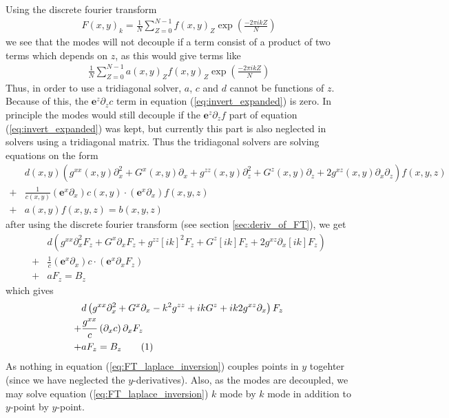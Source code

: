 \documentclass[12pt]{article}
\def\L{\left}
\def\R{\right}
\newcommand{\ve}[1]{\ensuremath{\boldsymbol{#1}}}
\newcommand\numberthis{\addtocounter{equation}{1}\tag{\theequation}}
\begin{document}
Using the discrete fourier transform
%
\begin{align}
    F(x,y)_{k} =
    \frac{1}{N}\sum_{Z=0}^{N-1}f(x,y)_{Z}\exp\L(\frac{-2\pi i k Z}{N}\R)
\end{align}
%
we see that the modes will not decouple if a term consist of a product of two
terms which depends on $z$, as this would give terms like
%
\begin{align*}
    \frac{1}{N}\sum_{Z=0}^{N-1}
        a(x,y)_Z
        f(x,y)_Z
        \exp\L(\frac{-2\pi i k Z}{N}\R)
\end{align*}
%
Thus, in order to use a tridiagonal solver, $a$, $c$ and $d$ cannot be
functions of $z$. Because of this, the $\ve{e}^z \partial_z c$ term in equation
(\ref{eq:invert_expanded}) is zero. In principle the modes would still decouple
if the $\ve{e}^z \partial_z f$ part of equation (\ref{eq:invert_expanded}) was
kept, but currently this part is also neglected in solvers using a tridiagonal
matrix. Thus the tridiagonal solvers are solving equations on the form
%
\begin{align*}
    \, &d(x,y)
    \L(    g^{xx}(x,y) \partial_x^2
         + G^x(x,y) \partial_x
         + g^{zz}(x,y) \partial_z^2
         + G^z(x,y) \partial_z
         + 2g^{xz}(x,y) \partial_x \partial_z
    \R)
    f(x,y,z)
    \\
%
    +& \frac{1}{c(x,y)}\L(
          \ve{e}^x \partial_x
    \R)
    c(x,y)
    \cdot
       \L(
          \ve{e}^x \partial_x
       \R)
       f(x,y,z)
       \\
%
   +& a(x,y)f(x,y,z) = b(x,y,z)
\end{align*}
%
after using the discrete fourier transform (see section \ref{sec:deriv_of_FT}),
we get
%
\begin{align*}
    \, &d
    \L(    g^{xx} \partial_x^2F_z
         + G^x \partial_xF_z
         + g^{zz} [i k]^2F_z
         + G^z [i k]F_z
         + 2g^{xz} \partial_x[i k]F_z
    \R)
    \\
%
    +& \frac{1}{c}\L(
          \ve{e}^x \partial_x
    \R)
    c
    \cdot
       \L(
          \ve{e}^x \partial_xF_z
       \R)
       \\
%
    +& aF_z = B_z
\end{align*}
%
which gives
%
\begin{align*}
    \, &d
    \L(    g^{xx} \partial_x^2
         + G^x \partial_x
         - k^2 g^{zz}
         + i kG^z
         + i k2g^{xz} \partial_x
    \R)F_z
    \\
%
    +& \frac{g^{xx}}{c}
    \L(
        \partial_x c
    \R)
     \partial_xF_z
       \\
%
    +& aF_z = B_z
    \numberthis
    \label{eq:FT_laplace_inversion}
\end{align*}
%
As nothing in equation (\ref{eq:FT_laplace_inversion}) couples points in $y$
togehter (since we have neglected the $y$-derivatives). Also, as the modes are
decoupled, we may solve equation (\ref{eq:FT_laplace_inversion})  $k$ mode by
$k$ mode in addition to $y$-point by $y$-point.
\end{document}
